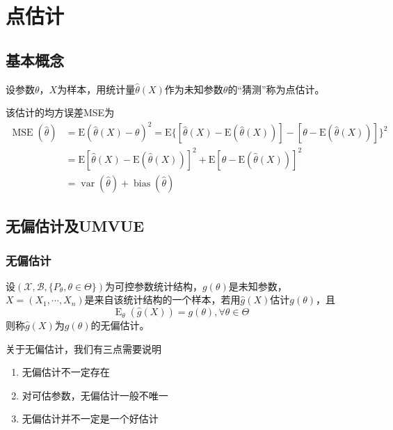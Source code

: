 \section{点估计}
\subsection{基本概念}
\begin{definition}[点估计]
    设参数$\theta$，$X$为样本，用统计量$\hat{\theta}(X)$作为未知参数$\theta$的“猜测”称为点估计。
\end{definition}
该估计的均方误差MSE为
\[
    \begin{array}{ll}
        \operatorname{MSE}(\hat{\theta}) &= \mathrm{E}(\hat{\theta}(X)-\theta)^2=\mathrm{E}\{[\hat{\theta}(X)-\mathrm{E}(\hat{\theta}(X))]-[\theta-\mathrm{E}(\hat{\theta}(X))]\}^2\\
        &=\mathrm{E}[\hat{\theta}(X)-\mathrm{E}(\hat{\theta}(X))]^2 + \mathrm{E}[\theta-\mathrm{E}(\hat{\theta}(X))]^2\\
        &=\operatorname{var}(\hat{\theta}) + \operatorname{bias}(\hat{\theta})
    \end{array}
\]
\subsection{无偏估计及UMVUE}
\subsubsection{无偏估计}
\begin{definition}[无偏估计]
    设$(\mathscr{X},\mathscr{B},\{P_{\theta},\theta\in\Theta\})$为可控参数统计结构，$g(\theta)$是未知参数，$X = (X_1,\cdots,X_n)$是来自该统计结构的一个样本，若用$\hat{g}(X)$估计$g(\theta)$，且
    \[
        \operatorname{E}_{\theta}(\hat{g}(X)) = g(\theta),\forall \theta\in\Theta
    \]
    则称$\hat{g}(X)$为$g(\theta)$的无偏估计。
\end{definition}
\begin{remark}
    关于无偏估计，我们有三点需要说明
    \begin{enumerate}
        \item 无偏估计不一定存在
        \item 对可估参数，无偏估计一般不唯一
        \item 无偏估计并不一定是一个好估计
    \end{enumerate}
\end{remark}

